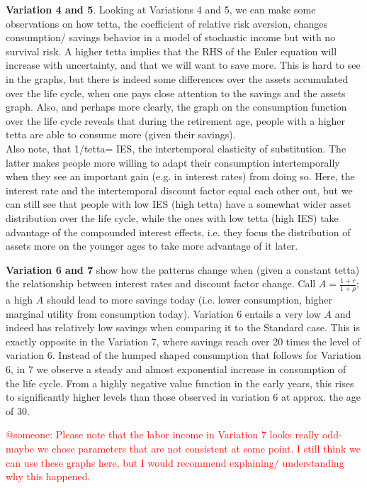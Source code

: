 \documentclass[12pt,a4paper]{article}
\begin{document}
\textbf{Variation 4 and 5}. Looking at Variations 4 and 5, we can make some observations on how tetta, the coefficient of relative risk aversion, changes consumption/ savings behavior in a model of stochastic income but with no survival risk. A higher tetta implies that the RHS of the Euler equation will increase with uncertainty, and that we will want to save more. This is hard to see in the graphs, but there is indeed some differences over the assets accumulated over the life cycle, when one pays close attention to the savings and the assets graph. Also, and perhaps more clearly, the graph on the consumption function over the life cycle reveals that during the retirement age, people with a higher tetta are able to consume more (given their savings).\\
Also note, that 1/tetta= IES, the intertemporal elasticity of substitution. The latter makes people more willing to adapt their consumption intertemporally when they see an important gain (e.g. in interest rates) from doing so. Here, the interest rate and the intertemporal discount factor equal each other out, but we can still see that people with low IES (high tetta) have a somewhat wider asset distribution over the life cycle, while the ones with low tetta (high IES) take advantage of the compounded interest effects, i.e. they focus the distribution of assets more on the younger ages to take more advantage of it later.

\textbf{Variation 6 and 7} show how the patterns change when (given a constant tetta) the relationship between interest rates and discount factor change. Call $A = \frac{1+r}{1+\rho}$; a high $A$ should lead to more savings today (i.e. lower consumption, higher marginal utility from consumption today). Variation 6 entails a very low $A$ and indeed has relatively low savings when comparing it to the Standard case. This is exactly opposite in the Variation 7, where savings reach over 20 times the level of variation 6. Instead of the humped shaped consumption that follows for Variation 6, in 7 we observe a steady and almost exponential increase in consumption of the life cycle. From a highly negative value function in the early years, this rises to significantly higher levels than those observed in variation 6 at approx. the age of 30.

\textcolor{red}{@someone: Please note that the labor income in Variation 7 looks really odd- maybe we chose parameters that are not consistent at some point. I still think we can use these graphs here, but I would recommend explaining/ understanding why this happened. }
\end{document}

